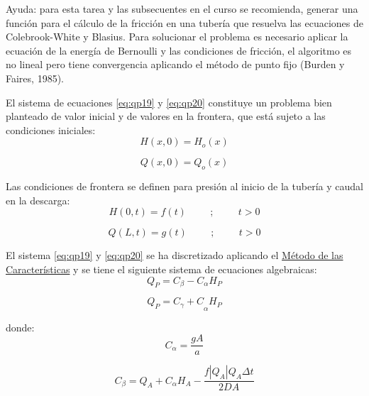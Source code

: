 \documentclass[letterpaper]{report}
\begin{document}
\begin{mdframed}[backgroundcolor=verdeclaro]
	Ayuda: para esta tarea y las subsecuentes en el curso se recomienda, generar una función para el cálculo de la fricción en una tubería que resuelva las ecuaciones de Colebrook-White y Blasius. Para solucionar el problema es necesario aplicar la ecuación de la energía de Bernoulli y las condiciones de fricción, el algoritmo es no lineal pero tiene convergencia aplicando el método de punto fijo (Burden y Faires, 1985).
\end{mdframed}
El sistema de ecuaciones \ref{eq:qp19} y \ref{eq:qp20} constituye un problema bien planteado de valor inicial y de valores en la frontera, que está sujeto a las condiciones iniciales:
\begin{equation}
	H(x,0)=H_o(x)
\end{equation}

\begin{equation}
	Q(x,0)=Q_o(x)
\end{equation}

Las condiciones de frontera se definen para presión al inicio de la tubería y caudal en la descarga:
\begin{equation}
	H(0,t)=f(t) \hspace{1cm} ; \hspace{1cm} t>0
\label{eq:cf1}
\end{equation}

\begin{equation}
	Q(L,t)=g(t) \hspace{1cm} ; \hspace{1cm} t>0
\label{eq:cf2}
\end{equation}

El sistema \ref{eq:qp19} y \ref{eq:qp20} se ha discretizado aplicando el \underline{Método de las Características} y se tiene el siguiente sistema de ecuaciones algebraicas:
\begin{equation}
	Q_P=C_\beta-C_\alpha H_P
\label{eq:qp22}
\end{equation}

\begin{equation}
	Q_P={C_\gamma+C}_\alpha H_P
\label{eq:qp23}
\end{equation}

donde:
\begin{equation}
	C_\alpha=\dfrac{gA}{a}
\end{equation}

\begin{equation}
	C_\beta=Q_A+C_\alpha H_A-\dfrac{f|Q_A|Q_A \Delta t}{2DA}
\end{equation}
\end{document}
